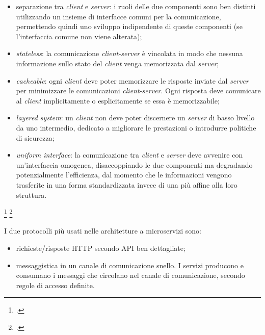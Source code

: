 \begin{itemize}
  \item separazione tra \emph{client} e \emph{server}: i ruoli delle due componenti sono ben distinti utilizzando un insieme di interfacce comuni per la comunicazione, permettendo quindi uno sviluppo indipendente di queste componenti (se l'interfaccia comune non viene alterata);
  \item \emph{stateless}: la comunicazione \emph{client-server} è vincolata in modo che nessuna informazione sullo stato del \emph{client} venga memorizzata dal \emph{server};
  \item \emph{cacheable}: ogni \emph{client} deve poter memorizzare le risposte inviate dal \emph{server} per minimizzare le comunicazioni \emph{client-server}. Ogni risposta deve comunicare al \emph{client} implicitamente o esplicitamente se essa è memorizzabile;
  \item \emph{layered system}: un \emph{client} non deve poter discernere un \emph{server} di basso livello da uno intermedio, dedicato a migliorare le prestazioni o introdurre politiche di sicurezza;
  \item \emph{uniform interface}: la comunicazione tra \emph{client} e \emph{server} deve avvenire con un'interfaccia omogenea, disaccoppiando le due componenti ma degradando potenzialmente l'efficienza, dal momento che le informazioni vengono trasferite in una forma standardizzata invece di una più affine alla loro struttura.
\end{itemize}
\footcite{site:rest-wiki}
\footcite{rest-thesis}

I due protocolli più usati nelle architetture a microservizi sono:
\begin{itemize}
  \item richieste/risposte HTTP secondo API ben dettagliate;
  \item messaggistica in un canale di comunicazione snello. I servizi producono e consumano i messaggi che circolano nel canale di comunicazione, secondo regole di accesso definite.
\end{itemize}


